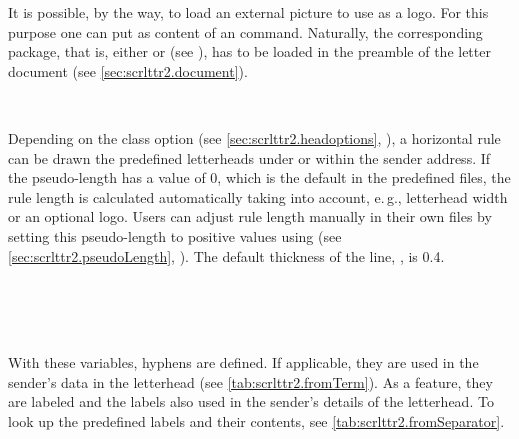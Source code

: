 It is possible, by the way, to load an external picture to use as a
logo. For this purpose one can put as content of 
an  command. Naturally, the corresponding
package, that is, either  or  (see
\cite{package:graphics}), has to be loaded in the preamble of the
letter document (see \autoref{sec:scrlttr2.document}).
%
%
%
%
%
%
%
%

\begin{Declaration}
  \\
\end{Declaration}
%
%
Depending on the class option  (see
\autoref{sec:scrlttr2.headoptions},
), a horizontal rule can be
drawn the predefined letterheads under or within the sender
address. If the pseudo-length  has a value of
0, which is the default in the predefined  files,
the rule length is calculated automatically taking into account,
e.\,g., letterhead width or an optional logo. Users can adjust rule
length manually in their own  files by setting this
pseudo-length to positive values using \Macro{\@setplength} (see
\autoref{sec:scrlttr2.pseudoLength},
). The default
thickness of the line,
, is 0.4.
%
%
%

\begin{Declaration}
  \\
  \\
  \\
\end{Declaration}
%
%
%
%
With these variables, hyphens are defined. If applicable, they are
used in the sender's data in the letterhead (see
\autoref{tab:scrlttr2.fromTerm}). As a feature, they are labeled and
the labels also used in the sender's details of the letterhead. To
look up the predefined labels and their contents, see
\autoref{tab:scrlttr2.fromSeparator}.
%
%
%
%
%
%


